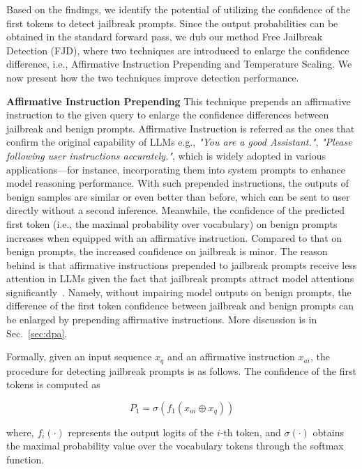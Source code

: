 \documentclass{article}
\begin{document}
Based on the findings, we identify the potential of utilizing the confidence of the first tokens to detect jailbreak prompts. Since the output probabilities can be obtained in the standard forward pass, we dub our method Free Jailbreak Detection (FJD), where two techniques are introduced to enlarge the confidence difference, i.e., Affirmative Instruction Prepending and Temperature Scaling. We now present how the two techniques improve detection performance.

\textbf{Affirmative Instruction Prepending} This technique prepends an affirmative instruction to the given query to enlarge the confidence differences between jailbreak and benign prompts. Affirmative Instruction is referred as the ones that confirm the original capability of LLMs e.g., \textit{"You are a good Assistant."}, \textit{"Please following user instructions accurately."}, which is widely adopted in various applications—for instance, incorporating them into system prompts to enhance model reasoning performance. With such prepended instructions, the outputs of benign samples are similar or even better than before, which can be sent to user directly without a second inference. Meanwhile, the confidence of the predicted first token (i.e., the maximal probability over vocabulary) on benign prompts increases when equipped with an affirmative instruction. Compared to that on benign prompts, the increased confidence on jailbreak is minor. The reason behind is that affirmative instructions prepended to jailbreak prompts receive less attention in LLMs given the fact that jailbreak prompts attract model attentions significantly~\citep{arditi2024refusal}. Namely, without impairing model outputs on benign prompts, the difference of the first token confidence between jailbreak and benign prompts can be enlarged by prepending affirmative instructions. More discussion is in Sec.~\ref{sec:dpa}. 
 
Formally, given an input sequence $x_q$ and an affirmative instruction $x_{ai}$, the procedure for detecting jailbreak prompts is as follows. The confidence of the first tokens is computed as


\begin{equation}
    P_1=\sigma(f_{1}(x_{ai}\oplus x_q))
\end{equation} 

where, $f_i(\cdot)$ represents the output logits of the $i$-th token, and $\sigma(\cdot)$ obtains the maximal probability value over the vocabulary tokens through the softmax function.
\end{document}

